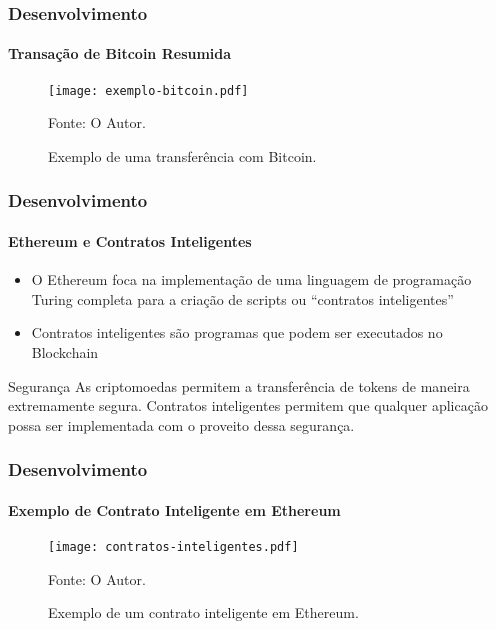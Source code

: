 \documentclass[aspectratio=43]{beamer}
\begin{document}
\begin{frame}
    \frametitle{Desenvolvimento}
    \framesubtitle{Transação de Bitcoin Resumida}
    
    \begin{figure}[H]
        \caption{\label{fig:exemplo-bitcoin}Exemplo de uma transferência
            com Bitcoin.}
        \begin{center}
            \texttt{[image: exemplo-bitcoin.pdf]}
        \end{center}
        Fonte: O Autor.
    \end{figure}
\end{frame}

\begin{frame}
    \frametitle{Desenvolvimento}
    \framesubtitle{Ethereum e Contratos Inteligentes}
    
    \begin{itemize}
        \item O Ethereum foca na implementação de uma linguagem de
            programação Turing completa para a criação de scripts ou
            ``contratos inteligentes'' \cite{Narayanan2016}

        \item Contratos inteligentes são programas que podem ser
            executados no Blockchain
    \end{itemize}

    \begin{block}{Segurança}
        As criptomoedas permitem a transferência de tokens de maneira
        extremamente segura. Contratos inteligentes permitem que
        qualquer aplicação possa ser implementada com o proveito dessa
        segurança.
    \end{block}
\end{frame}

\begin{frame}
    \frametitle{Desenvolvimento}
    \framesubtitle{Exemplo de Contrato Inteligente em Ethereum}
\begin{figure}[H]
    \caption{\label{fig:contratos-inteligentes}Exemplo de um contrato
    inteligente em Ethereum.}
    \begin{center}
        \texttt{[image: contratos-inteligentes.pdf]}
    \end{center}
    Fonte: O Autor.
\end{figure}

\end{frame}
\end{document}
